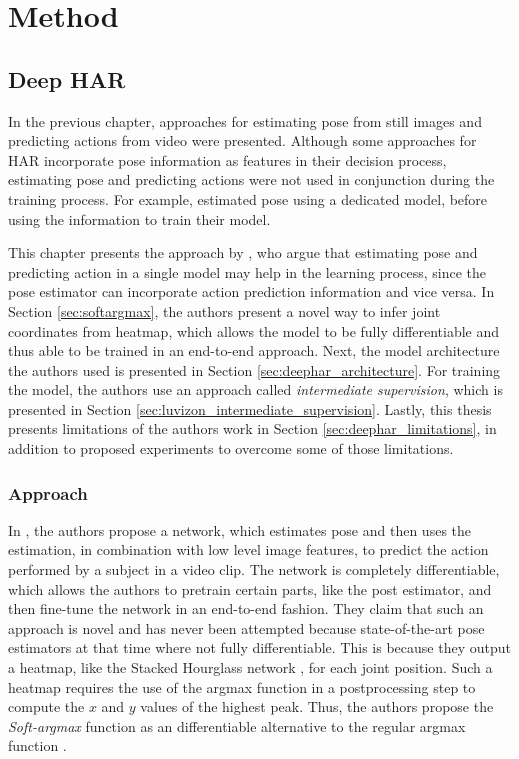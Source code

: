 \chapter{Method}
\section{Deep HAR}
\label{sec:chapter4}
In the previous chapter, approaches for estimating pose from still images and predicting actions from video were presented.
Although some approaches for HAR incorporate pose information as features in their decision process, estimating pose and predicting actions were not used in conjunction during the training process.
For example, \cite{choutas_potion:_2018}  estimated pose using a dedicated model, before using the information to train their model. 

This chapter presents the approach by \cite{luvizon_2d/3d_2018}, who argue that estimating pose and predicting action in a single model may help in the learning process, since the pose estimator can incorporate action prediction information and vice versa.
In Section \ref{sec:softargmax}, the authors present a novel way to infer joint coordinates from heatmap, which allows the model to be fully differentiable and thus able to be trained in an end-to-end approach.
Next, the model architecture the authors used is presented in Section \ref{sec:deephar_architecture}.
For training the model, the authors use an approach called \textit{intermediate supervision}, which is presented in Section \ref{sec:luvizon_intermediate_supervision}.
Lastly, this thesis presents limitations of the authors work in Section \ref{sec:deephar_limitations}, in addition to proposed experiments to overcome some of those limitations.

\subsection{Approach}
\label{sec:deephar_approach}

In \cite{luvizon_2d/3d_2018}, the authors propose a network, which estimates pose and then uses the estimation, in combination with low level image features, to predict the action performed by a subject in a video clip.
The network is completely differentiable, which allows the authors to pretrain certain parts, like the post estimator, and then fine-tune the network in an end-to-end fashion.
They claim that such an approach is novel and has never been attempted because state-of-the-art pose estimators at that time where not fully differentiable.
This is because they output a heatmap, like the Stacked Hourglass network \cite{newell_stacked_2016} , for each joint position.
Such a heatmap requires the use of the argmax function in a postprocessing step to compute the $x$ and $y$ values of the highest peak.
Thus, the authors propose the \textit{Soft-argmax} function as an differentiable alternative to the regular argmax function .

